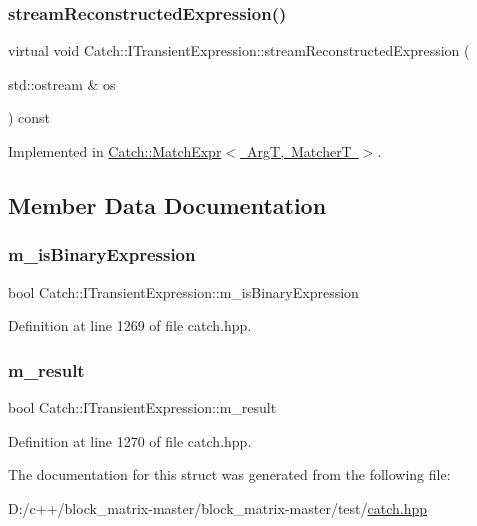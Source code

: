 \subsubsection{\texorpdfstring{stream\+Reconstructed\+Expression()}{streamReconstructedExpression()}}
{\footnotesize\ttfamily virtual void Catch\+::\+I\+Transient\+Expression\+::stream\+Reconstructed\+Expression (\begin{DoxyParamCaption}\item[{std\+::ostream \&}]{os }\end{DoxyParamCaption}) const\hspace{0.3cm}{\ttfamily [pure virtual]}}



Implemented in \mbox{\hyperlink{class_catch_1_1_match_expr_ad3e41adb597750b2219bb37e51185629}{Catch\+::\+Match\+Expr$<$ Arg\+T, Matcher\+T $>$}}.



\subsection{Member Data Documentation}
\mbox{\label{struct_catch_1_1_i_transient_expression_a75ce48da824d514d08152d396abb28d8}} 
\subsubsection{\texorpdfstring{m\+\_\+is\+Binary\+Expression}{m\_isBinaryExpression}}
{\footnotesize\ttfamily bool Catch\+::\+I\+Transient\+Expression\+::m\+\_\+is\+Binary\+Expression}



Definition at line 1269 of file catch.\+hpp.

\mbox{\label{struct_catch_1_1_i_transient_expression_a4646e2b5e0156e913653ec3b9b60c942}} 
\subsubsection{\texorpdfstring{m\+\_\+result}{m\_result}}
{\footnotesize\ttfamily bool Catch\+::\+I\+Transient\+Expression\+::m\+\_\+result}



Definition at line 1270 of file catch.\+hpp.



The documentation for this struct was generated from the following file\+:\begin{DoxyCompactItemize}
\item 
D\+:/c++/block\+\_\+matrix-\/master/block\+\_\+matrix-\/master/test/\mbox{\hyperlink{catch_8hpp}{catch.\+hpp}}\end{DoxyCompactItemize}

